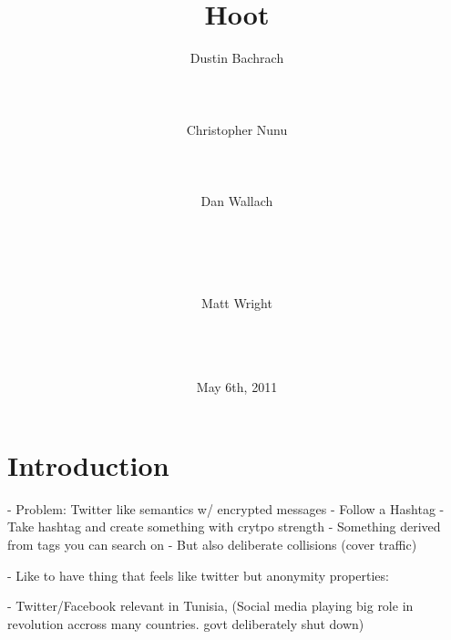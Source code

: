 \documentclass{acm_proc_article-sp}
\begin{document}

\author{
\alignauthor
	Dustin Bachrach\\
	\\
	\\
	\\
\alignauthor
 	Christopher Nunu\\
	\\
	\\
	\\
\alignauthor
	Dan Wallach\\
	\\
	\\
	\\
	\\
\and
\alignauthor
	Matt Wright\\
	\\
	\\
	\\
}

\title{Hoot}
\date{May 6th, 2011}

\maketitle

\begin{abstract}

\end{abstract}

\section{Introduction}

- Problem: Twitter like semantics w/ encrypted messages
	- Follow a Hashtag
	- Take hashtag and create something with crytpo strength
	- Something derived from tags you can search on
	- But also deliberate collisions (cover traffic)
	
- Like to have thing that feels like twitter but anonymity properties:

- Twitter/Facebook relevant in Tunisia, (Social media playing big role in revolution accross many countries. govt deliberately shut down)
\end{document}
